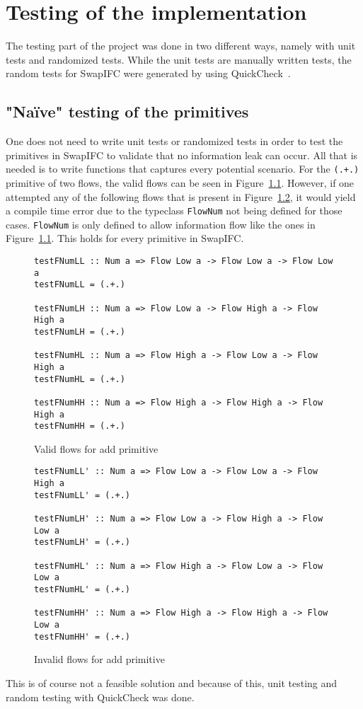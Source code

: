 \chapter{Testing of the implementation}
\label{chapter:testing}
The testing part of the project was done in two different ways, namely with unit tests and randomized tests. While the unit tests are manually written tests, the random tests for SwapIFC were generated by using QuickCheck~\cite{quickcheck, quickcheck-wiki}.
\section{"Naïve" testing of the primitives}
One does not need to write unit tests or randomized tests in order to test the primitives in SwapIFC to validate that no information leak can occur. All that is needed is to write functions that captures every potential scenario. For the {\tt (.+.)} primitive of two flows, the valid flows can be seen in Figure~\ref{fig:validFlow}.
However, if one attempted any of the following flows that is present in Figure~\ref{fig:invalidFlow}, it would yield a compile time error due to the typeclass {\tt FlowNum} not being defined for those cases. {\tt FlowNum} is only defined to allow information flow like the ones in Figure~\ref{fig:validFlow}. This holds for every primitive in SwapIFC.
\begin{figure}[h]
\begin{verbatim}
testFNumLL :: Num a => Flow Low a -> Flow Low a -> Flow Low a
testFNumLL = (.+.)
  
testFNumLH :: Num a => Flow Low a -> Flow High a -> Flow High a
testFNumLH = (.+.)
    
testFNumHL :: Num a => Flow High a -> Flow Low a -> Flow High a
testFNumHL = (.+.)
    
testFNumHH :: Num a => Flow High a -> Flow High a -> Flow High a
testFNumHH = (.+.)
\end{verbatim}
\caption{Valid flows for add primitive}
\label{fig:validFlow}
\end{figure}
\begin{figure}[h]
\begin{verbatim}
testFNumLL' :: Num a => Flow Low a -> Flow Low a -> Flow High a
testFNumLL' = (.+.)
  
testFNumLH' :: Num a => Flow Low a -> Flow High a -> Flow Low a
testFNumLH' = (.+.)

testFNumHL' :: Num a => Flow High a -> Flow Low a -> Flow Low a
testFNumHL' = (.+.)

testFNumHH' :: Num a => Flow High a -> Flow High a -> Flow Low a
testFNumHH' = (.+.)
\end{verbatim}
\caption{Invalid flows for add primitive}
\label{fig:invalidFlow}
\end{figure}
This is of course not a feasible solution and because of this, unit testing and random testing with QuickCheck was done.

